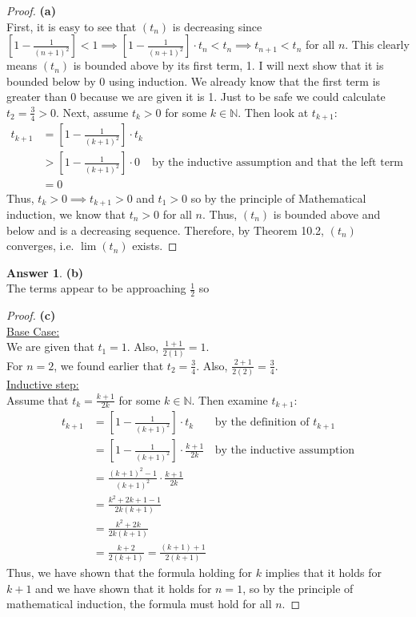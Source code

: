 \documentclass[10pt,a4paper]{article}
\theoremstyle{definition}
\newtheorem*{answer*}{Answer}
\begin{document}
\begin{proof}{\textbf{(a)}}
\\First, it is easy to see that $(t_n)$ is decreasing since $\displaystyle \left[1 - \frac{1}{(n + 1)^2}\right] < 1 \implies \left[1 - \frac{1}{(n+1)^2}\right]\cdot t_n < t_n \implies t_{n+1} < t_n$ for all $n$. This clearly means $(t_n)$ is bounded above by its first term, 1. I will next show that it is bounded below by 0 using induction. We already know that the first term is greater than 0 because we are given it is 1. Just to be safe we could calculate $t_2 = \frac{3}{4} > 0$. Next, assume $t_k > 0$ for some $k \in \mathbb{N}$. Then look at $t_{k+1}$:
\begin{align*}
t_{k + 1} &= \left[1 - \frac{1}{(k+1)^2}\right] \cdot t_k\\
&> \left[1 - \frac{1}{(k+1)^2}\right] \cdot 0 &\text{by the inductive assumption and that the left term is positve}\\
&= 0
\end{align*}
Thus, $t_k > 0 \implies t_{k+1} > 0$ and $t_1 > 0$ so by the principle of Mathematical induction, we know that $t_n > 0$ for all $n$. Thus, $(t_n)$ is bounded above and below and is a decreasing sequence. Therefore, by Theorem 10.2, $(t_n)$ converges, i.e. $\lim(t_n)$ exists.
\end{proof}

\begin{answer*}{\textbf{(b)}}
\\The terms appear to be approaching $\frac{1}{2}$ so 
\end{answer*}

\begin{proof}{\textbf{(c)}}
\\\underline{Base Case:}
\\We are given that $t_1 = 1$. Also, $\displaystyle \frac{1 + 1}{2(1)} = 1$.
\\For $n = 2$, we found earlier that $t_2 = \frac{3}{4}$. Also, $\displaystyle \frac{2 + 1}{2(2)} = \frac{3}{4}$.
\\\underline{Inductive step:}
\\Assume that $\displaystyle t_k = \frac{k+1}{2k}$ for some $k \in \mathbb{N}$. Then examine $t_{k+1}$:
\begin{align*}
t_{k+1} &= \left[1 - \frac{1}{(k + 1)^2}\right]\cdot t_k &\text{by the definition of $t_{k+1}$}\\
&= \left[1 - \frac{1}{(k + 1)^2}\right]\cdot \frac{k + 1}{2k} &\text{by the inductive assumption}\\
&= \frac{(k + 1)^2 - 1}{(k + 1)^2} \cdot \frac{k + 1}{2k}\\
&= \frac{k^2 + 2k + 1 - 1}{2k(k + 1)}\\
&= \frac{k^2 + 2k}{2k(k+1)}\\
&= \frac{k + 2}{2(k+1)} = \frac{(k + 1) + 1}{2(k+1)}
\end{align*}
Thus, we have shown that the formula holding for $k$ implies that it holds for $k + 1$ and we have shown that it holds for $n = 1$, so by the principle of mathematical induction, the formula must hold for all $n$. 
\end{proof}
\end{document}
